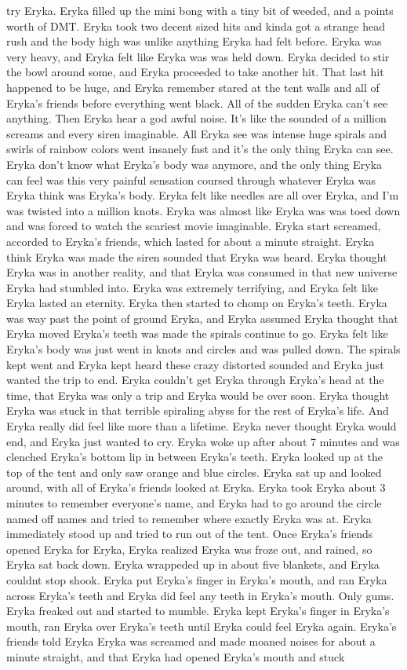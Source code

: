 \documentclass[12pt]{book}
\begin{document}
try Eryka. Eryka filled up the mini bong with a tiny bit of weeded, and a points worth of DMT. Eryka took two decent sized hits and kinda got a strange head rush and the body high was unlike anything Eryka had felt before. Eryka was very heavy, and Eryka felt like Eryka was was held down. Eryka decided to stir the bowl around some, and Eryka proceeded to take another hit. That last hit happened to be huge, and Eryka remember stared at the tent walls and all of Eryka's friends before everything went black. All of the sudden Eryka can't see anything. Then Eryka hear a god awful noise. It's like the sounded of a million screams and every siren imaginable. All Eryka see was intense huge spirals and swirls of rainbow colors went insanely fast and it's the only thing Eryka can see. Eryka don't know what Eryka's body was anymore, and the only thing Eryka can feel was this very painful sensation coursed through whatever Eryka was Eryka think was Eryka's body. Eryka felt like needles are all over Eryka, and I'm was twisted into a million knots. Eryka was almost like Eryka was was toed down and was forced to watch the scariest movie imaginable. Eryka start screamed, accorded to Eryka's friends, which lasted for about a minute straight. Eryka think Eryka was made the siren sounded that Eryka was heard. Eryka thought Eryka was in another reality, and that Eryka was consumed in that new universe Eryka had stumbled into. Eryka was extremely terrifying, and Eryka felt like Eryka lasted an eternity. Eryka then started to chomp on Eryka's teeth. Eryka was way past the point of ground Eryka, and Eryka assumed Eryka thought that Eryka moved Eryka's teeth was made the spirals continue to go. Eryka felt like Eryka's body was just went in knots and circles and was pulled down. The spirals kept went and Eryka kept heard these crazy distorted sounded and Eryka just wanted the trip to end. Eryka couldn't get Eryka through Eryka's head at the time, that Eryka was only a trip and Eryka would be over soon. Eryka thought Eryka was stuck in that terrible spiraling abyss for the rest of Eryka's life. And Eryka really did feel like more than a lifetime. Eryka never thought Eryka would end, and Eryka just wanted to cry. Eryka woke up after about 7 minutes and was clenched Eryka's bottom lip in between Eryka's teeth. Eryka looked up at the top of the tent and only saw orange and blue circles. Eryka sat up and looked around, with all of Eryka's friends looked at Eryka. Eryka took Eryka about 3 minutes to remember everyone's name, and Eryka had to go around the circle named off names and tried to remember where exactly Eryka was at. Eryka immediately stood up and tried to run out of the tent. Once Eryka's friends opened Eryka for Eryka, Eryka realized Eryka was froze out, and rained, so Eryka sat back down. Eryka wrappeded up in about five blankets, and Eryka couldnt stop shook. Eryka put Eryka's finger in Eryka's mouth, and ran Eryka across Eryka's teeth and Eryka did feel any teeth in Eryka's mouth. Only gums. Eryka freaked out and started to mumble. Eryka kept Eryka's finger in Eryka's mouth, ran Eryka over Eryka's teeth until Eryka could feel Eryka again. Eryka's friends told Eryka Eryka was screamed and made moaned noises for about a minute straight, and that Eryka had opened Eryka's mouth and stuck 
\end{document}
